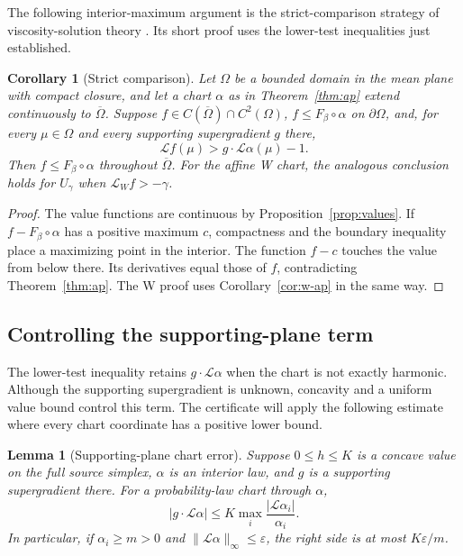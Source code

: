 \documentclass[11pt]{article}
\numberwithin{equation}{section}
\newtheorem{lemma}[theorem]{Lemma}
\newtheorem{corollary}[theorem]{Corollary}
\theoremstyle{definition}
\theoremstyle{remark}
\begin{document}
The following interior-maximum argument is the strict-comparison
strategy of viscosity-solution theory
\cite[Section~5.C]{crandallishiilions1992}.  Its short proof uses the
lower-test inequalities just established.

\begin{corollary}[Strict comparison]\label{ap:comparison}
Let \(\Omega\) be a bounded domain in the mean plane with compact
closure, and let a chart \(\alpha\) as in Theorem~\ref{thm:ap} extend
continuously to \(\overline\Omega\).  Suppose
\(f\in C(\overline\Omega)\cap C^2(\Omega)\),
\(f\leq F_\beta\circ\alpha\) on \(\partial\Omega\), and, for every
\(\mu\in\Omega\) and every supporting supergradient \(g\) there,
\[
 \mathcal L f(\mu)>g\cdot\mathcal L\alpha(\mu)-1.
\]
Then \(f\leq F_\beta\circ\alpha\) throughout \(\overline\Omega\).
For the affine W chart, the analogous conclusion holds for \(U_\gamma\)
when \(\mathcal L_W f>-\gamma\).
\end{corollary}

\begin{proof}
The value functions are continuous by Proposition~\ref{prop:values}.
If \(f-F_\beta\circ\alpha\) has a positive maximum \(c\), compactness
and the boundary inequality place a maximizing point in the interior.
The function \(f-c\) touches the value from below there.  Its derivatives
equal those of \(f\), contradicting Theorem~\ref{thm:ap}.  The W proof
uses Corollary~\ref{cor:w-ap} in the same way.
\end{proof}

\subsection{Controlling the supporting-plane term}

The lower-test inequality retains \(g\cdot\mathcal L\alpha\) when the
chart is not exactly harmonic.  Although the supporting supergradient is
unknown, concavity and a uniform value bound control this term.  The
certificate will apply the following estimate where every chart coordinate
has a positive lower bound.

\begin{lemma}[Supporting-plane chart error]\label{ap:chart-error}
Suppose \(0\leq h\leq K\) is a concave value on the full source
simplex, \(\alpha\) is an interior law, and \(g\) is a supporting
supergradient there.  For a probability-law chart through \(\alpha\),
\[
 |g\cdot\mathcal L\alpha|
 \leq K\max_i\frac{|\mathcal L\alpha_i|}{\alpha_i}.
\]
In particular, if \(\alpha_i\geq m>0\) and
\(\|\mathcal L\alpha\|_\infty\leq\varepsilon\), the right side
is at most \(K\varepsilon/m\).
\end{lemma}
\end{document}
